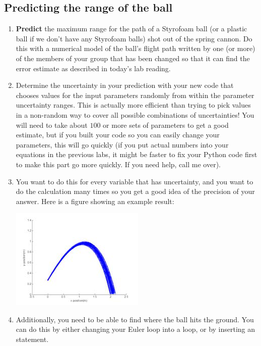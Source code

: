 \documentclass[twoside,11pt,ShortChapTitles]{BYUTextbook}
\begin{document}
\subsection{Predicting the range of the ball}
\begin{enumerate}
\item \textbf{Predict} the maximum range for the path of a Styrofoam ball
(or a plastic ball if we don't have any Styrofoam balls) shot out of the
spring cannon. Do this with a numerical model of the ball's flight path
written by one (or more) of the members of your group that has been changed
so that it can find the error estimate as described in today's lab reading.

\item Determine the uncertainty in your prediction with your new code that
chooses values for the input parameters randomly from within the parameter
uncertainty ranges. This is actually more efficient than trying to pick
values in a non-random way to cover all possible combinations of
uncertainties! You will need to take about $100$ or more sets of parameters
to get a good estimate, but if you built your code so you can easily change
your parameters, this will go quickly (if you put actual numbers into your
equations in the previous labs, it might be faster to fix your Python code
first to make this part go more quickly. If you need help, call me over).




\item You want to do this for every variable that has
uncertainty, and you want to do the calculation many times so you get a good
idea of the precision of your answer. Here is a figure showing an example
result:

\includegraphics[scale=0.6]{Lab9_figs/old_images-058.png}

\item Additionally, you need to be able to find where the ball hits the ground.  You can do this by either changing your Euler  loop into a  loop, or by inserting an  statement.

\end{enumerate}
\end{document}
